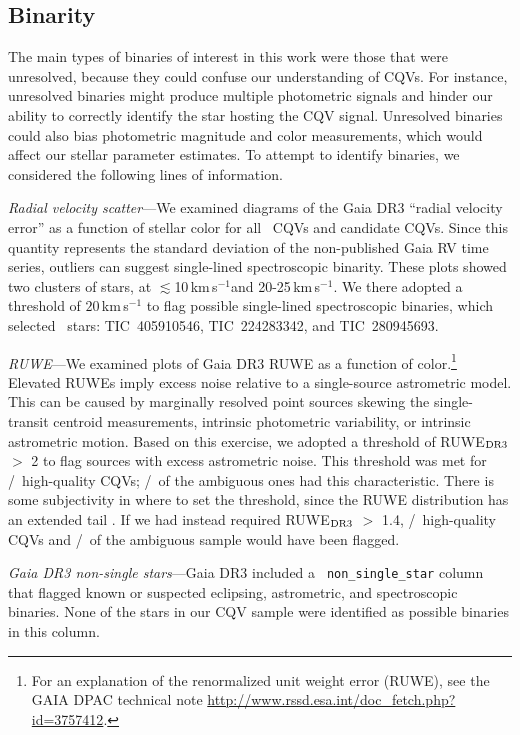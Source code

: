 \documentclass[11pt,twocolumn,tighten]{aastex63}
\newcommand{\kms}{{km\,s$^{-1}$}}
\begin{document}
\subsection{Binarity}
\label{subsec:binarity}

The main types of binaries of interest in this work were those that
were unresolved, because they could confuse our understanding of CQVs.
For instance, unresolved binaries might produce multiple photometric
signals and hinder our ability to correctly identify the star hosting
the CQV signal.  Unresolved binaries could also bias photometric magnitude
and color measurements, which would affect our stellar parameter
estimates.  To attempt to identify binaries, we considered the
following lines of information.

{\it Radial velocity scatter}---We examined diagrams of the Gaia DR3
``radial velocity error'' as a function of stellar color for all
\ncqvsnodebunked\ CQVs and candidate CQVs.  Since this quantity
represents the standard deviation of the non-published Gaia RV time
series, outliers can suggest single-lined spectroscopic binarity.
These plots showed two clusters of stars, at $\lesssim$10\,\kms and
20-25\,\kms.  We there adopted a threshold of $20$\,km\,s$^{-1}$ to
flag possible single-lined spectroscopic binaries, which selected
\nrvscatterflag\ stars: TIC~405910546, TIC~224283342, and
TIC~280945693.

{\it RUWE}---We examined plots of Gaia DR3 RUWE as a function of
color.\footnote{For an explanation of the renormalized unit weight
error (RUWE), see the GAIA DPAC technical note
\url{http://www.rssd.esa.int/doc_fetch.php?  id=3757412}.}  Elevated
RUWEs imply excess noise relative to a single-source astrometric
model.  This can be caused by marginally resolved point sources
skewing the single-transit centroid measurements,  intrinsic
photometric variability, or intrinsic astrometric motion.  Based on
this exercise, we adopted a threshold of RUWE$_{\rm DR3}$ $>$ 2 to
flag sources with excess astrometric noise.  This threshold was met
for \ngoodhighruwe/\ngoods\ high-quality CQVs;
\nmaybehighruwe/\nmaybes\ of the ambiguous ones had this
characteristic.  There is some subjectivity in where to set the
threshold, since the RUWE distribution has an extended tail
\citep[e.g.][]{2022MNRAS.513.5270P}.  If we had instead required
RUWE$_{\rm DR3}$ $>$ 1.4, \ngoodweakruwe/\ngoods\ high-quality CQVs
and \nmaybeweakruwe/\nmaybes\ of the ambiguous sample would have been
flagged.

{\it Gaia DR3 non-single stars}---Gaia DR3 included a {\tt
non\_single\_star} column that flagged known or suspected eclipsing,
astrometric, and spectroscopic binaries.  None of the stars in our CQV
sample were identified as possible binaries in this column.
\end{document}
